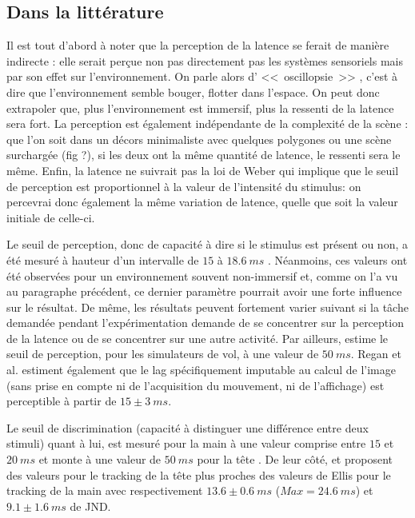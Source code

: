 	\subsection{Dans la littérature}
	\par Il est tout d'abord à noter que la perception de la latence se ferait de manière indirecte \citep{adelstein_head_2003}: elle serait perçue non pas directement pas les systèmes sensoriels mais par son effet sur l'environnement. On parle alors d' <<~oscillopsie~>> \citep{allison_tolerance_2001}, c'est à dire que l'environnement semble bouger, flotter dans l'espace. On peut donc extrapoler que, plus l'environnement est immersif, plus la ressenti de la latence sera fort. La perception est également indépendante de la complexité de la scène \citep{mania_perceptual_2004}: que l'on soit dans un décors minimaliste avec quelques polygones ou une scène surchargée (fig ?), si les deux ont la même quantité de latence, le ressenti sera le même. Enfin, la latence ne suivrait pas la loi de Weber \citep{adelstein_head_2003} qui implique que le seuil de perception est proportionnel à la valeur de l'intensité du stimulus: on percevrai donc également la même variation de latence, quelle que soit la valeur initiale de celle-ci.
	
	\par Le seuil de perception, donc de capacité à dire si le stimulus est présent ou non, a été mesuré à hauteur d'un intervalle de $15$ à $18.6~ms$ \citep{regan_real-time_1999}. Néanmoins, ces valeurs ont été observées pour un environnement souvent non-immersif et, comme on l'a vu au paragraphe précédent, ce dernier paramètre pourrait avoir une forte influence sur le résultat. De même, les résultats peuvent fortement varier suivant si la tâche demandée pendant l'expérimentation demande de se concentrer sur la perception de la latence ou de se concentrer sur une autre activité. Par ailleurs, \citep{brooks_whats_1999} estime le seuil de perception, pour les simulateurs de vol, à une valeur de $50~ms$. Regan et al. estiment également que le lag spécifiquement imputable au calcul de l'image (sans prise en compte ni de l'acquisition du mouvement, ni de l'affichage) est perceptible à partir de $15 \pm 3~ms$.
	
	\par Le seuil de discrimination (capacité à distinguer une différence entre deux stimuli) quant à lui, est mesuré pour la main à une valeur comprise entre $15$ et $20~ms$ et monte à une valeur de $50~ms$ pour la tête \citep{ellis_sensor_1999}. De leur côté, \citep{adelstein_head_2003} et \citep{mania_perceptual_2004} proposent des valeurs pour le tracking de la tête plus proches des valeurs de Ellis pour le tracking de la main avec respectivement $13.6 \pm 0.6~ms$ ($Max = 24.6~ms$) et $9.1 \pm 1.6~ms$ de JND.
	
